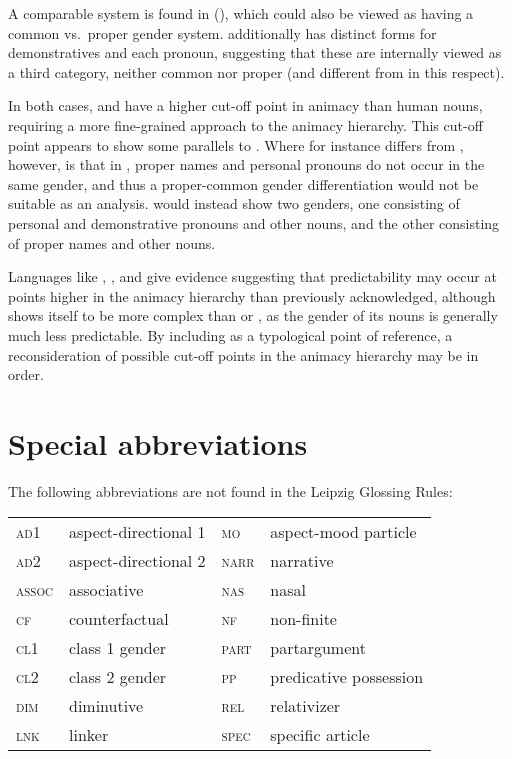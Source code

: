 \documentclass[output=collectionpaper,hidelinks]{langscibook}
\theoremstyle{remark}
\begin{document}
A comparable system is found in  (), which could also be viewed as having a
common vs.\ proper gender system.   additionally has distinct forms for
demonstratives and each pronoun, suggesting that these are internally viewed as
a third category, neither common nor proper (and different from  in this
respect).

\largerpage
In both cases,  and  have a higher cut-off point in animacy than
human nouns, requiring a more fine-grained approach to the animacy hierarchy.
This cut-off point appears to show some parallels to .  Where  for
instance differs from , however, is that in , proper names and personal
pronouns do not occur in the same gender, and thus a proper-common gender
differentiation would not be suitable as an analysis.   would instead show
two genders, one consisting of personal and demonstrative pronouns and other
nouns, and the other consisting of proper names and other nouns.

Languages like , , and  give evidence suggesting that
predictability may occur at points higher in the animacy hierarchy than
previously acknowledged, although  shows itself to be more complex than
 or , as the gender of its nouns is generally much less
predictable. By including  as a typological point of reference, a
reconsideration of possible cut-off points in the animacy hierarchy may be in
order.

\section*{Special abbreviations}

\noindent The following abbreviations are not found in the Leipzig Glossing Rules:
\medskip

\begin{tabularx}{\textwidth}{lXlX}
  \textsc{ad1}	&	aspect-directional 1	&	\textsc{mo}	&	aspect-mood particle	\\
  \textsc{ad2}	&	aspect-directional 2 &	\textsc{narr}	&	narrative	\\
  \textsc{assoc}	&	associative		&	\textsc{nas}	&	nasal	\\
  \textsc{cf}	&	counterfactual	&	\textsc{nf}	&	non-finite	\\
  \textsc{cl1}	&	class 1 gender		&	\textsc{part}	&	partargument	\\
 \textsc{cl2}	&	class 2 gender &	\textsc{pp}	&	predicative possession	\\
 	\textsc{dim}	&	diminutive	 &	\textsc{rel}	&	relativizer	\\
	\textsc{lnk}	&	linker &	\textsc{spec}	&	specific article	\\


\end{tabularx}
\end{document}
